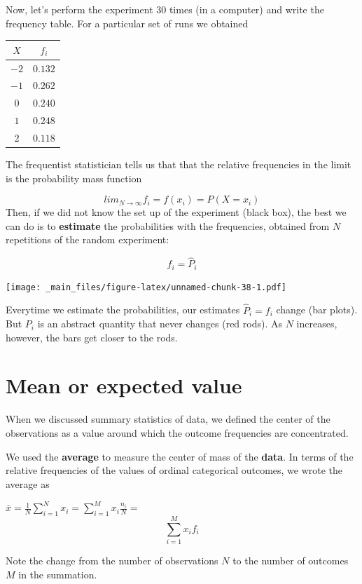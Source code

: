 \documentclass[
]{book}
\begin{document}
Now, let's perform the experiment \(30\) times (in a computer) and write the frequency table. For a particular set of runs we obtained

\begin{longtable}[]{@{}cc@{}}
\toprule\noalign{}
\(X\) & \(f_i\) \\
\midrule\noalign{}
\endhead
\bottomrule\noalign{}
\endlastfoot
\(-2\) & \(0.132\) \\
\(-1\) & \(0.262\) \\
\(0\) & \(0.240\) \\
\(1\) & \(0.248\) \\
\(2\) & \(0.118\) \\
\end{longtable}

The frequentist statistician tells us that that the relative frequencies in the limit is the probability mass function

\[lim_{N \rightarrow \infty} f_i = f(x_i)=P(X=x_i)\]
Then, if we did not know the set up of the experiment (black box), the best we can do is to \textbf{estimate} the probabilities with the frequencies, obtained from \(N\) repetitions of the random experiment:

\[f_i = \hat{P}_i\]

\texttt{[image: \_main\_files/figure-latex/unnamed-chunk-38-1.pdf]}

Everytime we estimate the probabilities, our estimates \(\hat{P}_i=f_i\) change (bar plots). But \(P_i\) is an abstract quantity that never changes (red rods). As \(N\) increases, however, the bars get closer to the rods.

\hypertarget{mean-or-expected-value}{%
\section{Mean or expected value}\label{mean-or-expected-value}}

When we discussed summary statistics of data, we defined the center of the observations as a value around which the outcome frequencies are concentrated.

We used the \textbf{average} to measure the center of mass of the \textbf{data}. In terms of the relative frequencies of the values of ordinal categorical outcomes, we wrote the average as

\(\bar{x}= \frac{1}{N} \sum_{i=1}^N x_i = \sum_{i=1}^M x_i \frac{n_i}{N}=\) \[\sum_{i=1}^M x_i f_i\]

Note the change from the number of observations \(N\) to the number of outcomes \(M\) in the summation.
\end{document}

